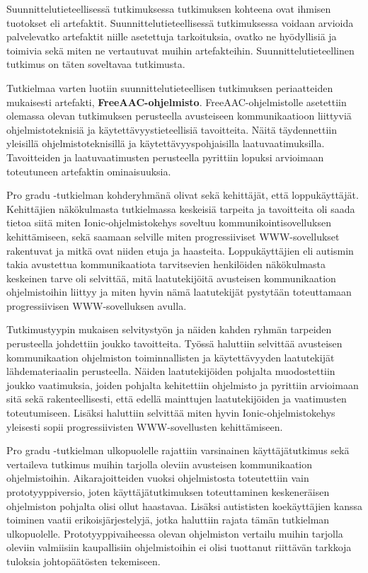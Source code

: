 \documentclass[utf8]{gradu3}
\begin{document}
Suunnittelutieteellisessä tutkimuksessa tutkimuksen kohteena ovat ihmisen tuotokset eli artefaktit. Suunnittelutieteellisessä tutkimuksessa voidaan arvioida palvelevatko artefaktit niille asetettuja tarkoituksia, ovatko ne hyödyllisiä ja toimivia sekä miten ne vertautuvat muihin artefakteihin. Suunnittelutieteellinen tutkimus on täten soveltavaa tutkimusta.

Tutkielmaa varten luotiin suunnittelutieteellisen tutkimuksen periaatteiden mukaisesti artefakti, \textbf{FreeAAC-ohjelmisto}. FreeAAC-ohjelmistolle asetettiin olemassa olevan tutkimuksen perusteella avusteiseen kommunikaatioon liittyviä ohjelmistoteknisiä ja käytettävyystieteellisiä tavoitteita. Näitä täydennettiin yleisillä ohjelmistoteknisillä ja käytettävyyspohjaisilla laatuvaatimuksilla. Tavoitteiden ja laatuvaatimusten perusteella pyrittiin lopuksi arvioimaan toteutuneen artefaktin ominaisuuksia.

Pro gradu -tutkielman kohderyhmänä olivat sekä kehittäjät, että loppukäyttäjät. Kehittäjien näkökulmasta tutkielmassa keskeisiä tarpeita ja tavoitteita oli saada tietoa siitä miten Ionic-ohjelmistokehys soveltuu kommunikointisovelluksen kehittämiseen, sekä saamaan selville miten progressiiviset WWW-sovellukset rakentuvat ja mitkä ovat niiden etuja ja haasteita. Loppukäyttäjien eli autismin takia avustettua kommunikaatiota tarvitsevien henkilöiden näkökulmasta keskeinen tarve oli selvittää, mitä laatutekijöitä avusteisen kommunikaation ohjelmistoihin liittyy ja miten hyvin nämä laatutekijät pystytään toteuttamaan progressiivisen WWW-sovelluksen avulla.

Tutkimustyypin mukaisen selvitystyön ja näiden kahden ryhmän tarpeiden perusteella johdettiin joukko tavoitteita. Työssä haluttiin selvittää avusteisen kommunikaation ohjelmiston toiminnallisten ja käytettävyyden laatutekijät lähdemateriaalin perusteella. Näiden laatutekijöiden pohjalta muodostettiin joukko vaatimuksia, joiden pohjalta kehitettiin ohjelmisto ja pyrittiin arvioimaan sitä sekä rakenteellisesti, että edellä mainttujen laatutekijöiden ja vaatimusten toteutumiseen. Lisäksi haluttiin selvittää miten hyvin Ionic-ohjelmistokehys yleisesti sopii progressiivisten WWW-sovellusten kehittämiseen.

Pro gradu -tutkielman ulkopuolelle rajattiin varsinainen käyttäjätutkimus sekä vertaileva tutkimus muihin tarjolla oleviin avusteisen kommunikaation ohjelmistoihin. Aikarajoitteiden vuoksi ohjelmistosta toteutettiin vain prototyyppiversio, joten käyttäjätutkimuksen toteuttaminen keskeneräisen ohjelmiston pohjalta olisi ollut haastavaa. Lisäksi autististen koekäyttäjien kanssa toiminen vaatii erikoisjärjestelyjä, jotka haluttiin rajata tämän tutkielman ulkopuolelle. Prototyyppivaiheessa olevan ohjelmiston vertailu muihin tarjolla oleviin valmiisiin kaupallisiin ohjelmistoihin ei olisi tuottanut riittävän tarkkoja tuloksia johtopäätösten tekemiseen.
\end{document}
